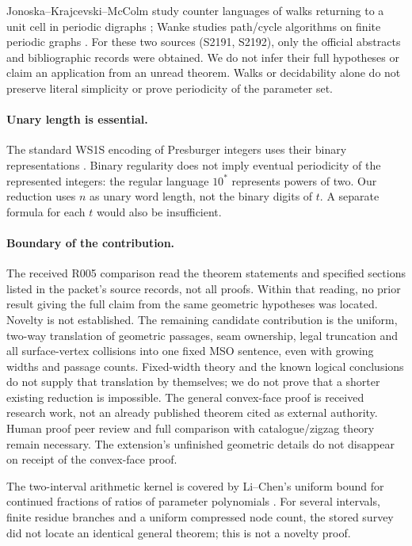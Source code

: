 \documentclass[11pt]{amsart}
\theoremstyle{definition}\newtheorem{definition}{Definition}
\begin{document}
Jonoska--Krajcevski--McColm study counter languages of walks returning
to a unit cell in periodic digraphs \cite{Counter}; Wanke studies
path/cycle algorithms on finite periodic graphs \cite{Wanke}.
For these two sources (S2191, S2192), only the official abstracts and
bibliographic records were obtained. We do not infer their full
hypotheses or claim an application from an unread theorem. Walks or
decidability alone do not preserve literal simplicity or prove
periodicity of the parameter set.

\paragraph{Unary length is essential.}
The standard WS1S encoding of Presburger integers uses their binary
representations \cite[printed pp.~11--12]{Thomas}. Binary regularity
does not imply eventual periodicity of the represented integers:
the regular language $10^*$ represents powers of two. Our reduction
uses $n$ as unary word length, not the binary digits of $t$.
A separate formula for each $t$ would also be insufficient.

\paragraph{Boundary of the contribution.}
The received R005 comparison read the theorem statements and specified
sections listed in the packet's source records, not all proofs. Within
that reading, no prior result giving the full claim from the same
geometric hypotheses was located. Novelty is not established. The
remaining candidate contribution is the uniform, two-way translation
of geometric passages, seam ownership, legal truncation and all
surface-vertex collisions into one fixed MSO sentence, even with
growing widths and passage counts. Fixed-width theory and the known
logical conclusions do not supply that translation by themselves;
we do not prove that a shorter existing reduction is impossible.
The general convex-face proof is received research work, not an
already published theorem cited as external authority. Human proof
peer review and full comparison with catalogue/zigzag theory remain
necessary. The extension's unfinished geometric details do not
disappear on receipt of the convex-face proof.

The two-interval arithmetic kernel is covered by Li--Chen's uniform
bound for continued fractions of ratios of parameter polynomials
\cite[Theorem 27]{LiChen}. For several intervals, finite residue
branches and a uniform compressed node count, the stored survey did
not locate an identical general theorem; this is not a novelty proof.
\end{document}
